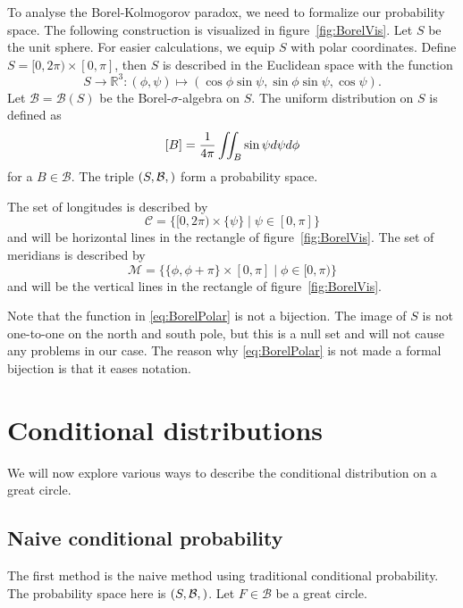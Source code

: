 \documentclass[twoside,a4paper]{report}
\theoremstyle{plain}
\theoremstyle{definition}
\theoremstyle{remark}
\numberwithin{equation}{chapter}
\newcommand{\R}{\mathbb{R}}
\let\P\relax
\DeclareMathOperator{\P}{\mathbb{P}}
\DeclareMathOperator{\1}{\mathbbm{1}}
\newcommand{\B}{\mathcal{B}}
\begin{document}
To analyse the Borel-Kolmogorov paradox, we need to formalize our probability space. The following construction is visualized in figure~\ref{fig:BorelVis}. Let $S$ be the unit sphere. For easier calculations, we equip $S$ with polar coordinates. Define $S=[0,2\pi)\times[0,\pi]$, then $S$ is described in the Euclidean space with the function
\begin{equation}\label{eq:BorelPolar}
S\to\R^3:(\phi,\psi)\mapsto(\cos\phi\sin\psi,\sin\phi\sin\psi,\cos\psi).
\end{equation}
Let $\B=\B(S)$ be the Borel-$\sigma$-algebra on $S$. The uniform distribution on $S$ is defined as
\begin{equation}
\P[B]=\frac{1}{4\pi}\iint_B\sin\psi d\psi d\phi
\end{equation}
for a $B\in\B$. The triple $(S,\B,\P)$ form a probability space.

The set of longitudes is described by 
\begin{equation}
\mathcal{C}=\{[0,2\pi)\times\{\psi\}\mid\psi\in[0,\pi]\}
\end{equation}
and will be horizontal lines in the rectangle of figure~\ref{fig:BorelVis}. The set of meridians is described by
\begin{equation}
\mathcal{M}=\{\{\phi,\phi+\pi\}\times[0,\pi]\mid\phi\in[0,\pi)\}
\end{equation}
and will be the vertical lines in the rectangle of figure~\ref{fig:BorelVis}.

Note that the function in \eqref{eq:BorelPolar} is not a bijection. The image of $S$ is not one-to-one on the north and south pole, but this is a null set and will not cause any problems in our case. The reason why \eqref{eq:BorelPolar} is not made a formal bijection is that it eases notation.

\section{Conditional distributions}
We will now explore various ways to describe the conditional distribution on a great circle.
\subsection{Naive conditional probability}\label{sec:BorelNaive}
The first method is the naive method using traditional conditional probability. The probability space here is $(S,\B,\P)$. Let $F\in\B$ be a great circle.
\end{document}
